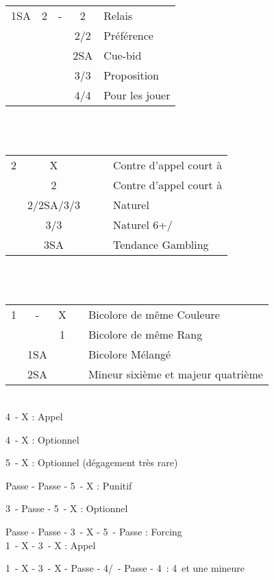 \documentclass[a4paper, oneside, 11pt]{report}
\begin{document}
	\begin{tabular}{cccc|l}
	1SA & 2\trefle & - & 2\carreau & Relais\\
	&&& 2\coeur/2\pique & Préférence\\
	&&& 2SA & Cue-bid\\
	&&& 3\coeur/3\pique & Proposition\\
	&&& 4\coeur/4\pique & Pour les jouer\\
	\end{tabular}\\\\

	\begin{tabular}{cccc|l}
	2\carreau & X &&& Contre d'appel court à \pique\\
	& 2\coeur &&& Contre d'appel court à \coeur\\
	& 2\pique/2SA/3\trefle/3\carreau &&& Naturel\\
	& 3\coeur/3\pique &&& Naturel 6+\coeur/\pique\\
	& 3SA &&& Tendance Gambling\\
	\end{tabular}\\\\
	
	\begin{tabular}{cccc|l}
	1\trefle & -  & X && Bicolore de même Couleure\\
	&& 1\carreau && Bicolore de même Rang\\
	& 1SA &&& Bicolore Mélangé\\
	& 2SA &&& Mineur sixième et majeur quatrième\\
	\end{tabular}\\
	
		4\coeur\ - X : Appel
		
		4\pique\ - X : Optionnel
		
		5\trefle\ - X : Optionnel (dégagement très rare)
		
		Passe - Passe - 5\trefle\ - X : Punitif
		
		3\trefle\ - Passe - 5\trefle\ - X : Optionnel
		
		Passe - Passe - 3\trefle\ - X - 5\trefle\ - Passe : Forcing\\
		
		1\pique\ - X - 3\pique\ - X : Appel
		
		1\pique\ - X - 3\pique\ - X - Passe - 4\trefle/\carreau\ - Passe - 4\coeur\ : 4\coeur\ et une mineure
		
\end{document}
